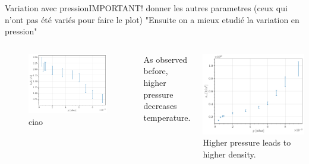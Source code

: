 \documentclass[10pt]{beamer}
\begin{document}
\begin{frame}{Variation avec pression}{IMPORTANT! donner les autres parametres (ceux qui n'ont pas été variés pour faire le plot)}
    "Ensuite on a mieux etudié la variation en pression"
    \begin{columns}
        \centering
        \begin{figure}
            \includegraphics[width=\textwidth]{../figures/temperatureeV_pressure.pdf}
            \caption{ciao}
            
        \end{figure}
        As observed before, higher pressure decreases temperature.

        \centering
        \includegraphics[width=\textwidth]{../figures/density_pressure.pdf}
        Higher pressure leads to higher density.

    \end{columns}
\end{frame}
\end{document}
